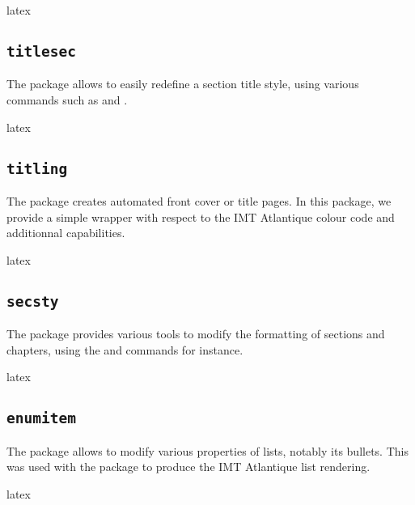 \documentclass{report}
\begin{document}
\begin{imtaCode}{latex}
\RequirePackage{tikz}
\end{imtaCode}

\subsection{\texttt{titlesec}}
The  package allows to easily redefine a section title style, using various commands such as  and .

\begin{imtaCode}{latex}
\RequirePackage{titlesec}
\end{imtaCode}


\subsection{\texttt{titling}}
The  package creates automated front cover or title pages. In this package, we provide a simple wrapper with respect to the IMT Atlantique colour code and additionnal capabilities.

\begin{imtaCode}{latex}
\RequirePackage{titling}
\end{imtaCode}


\subsection{\texttt{secsty}}
The  package provides various tools to modify the formatting of sections and chapters, using the  and  commands for instance.

\begin{imtaCode}{latex}
\RequirePackage{secsty}
\end{imtaCode}



\subsection{\texttt{enumitem}}
The  package allows to modify various properties of lists, notably its bullets. This was used with the  package to produce the IMT Atlantique list rendering.

\begin{imtaCode}{latex}
\RequirePackage{enumitem}
\end{imtaCode}
\end{document}
